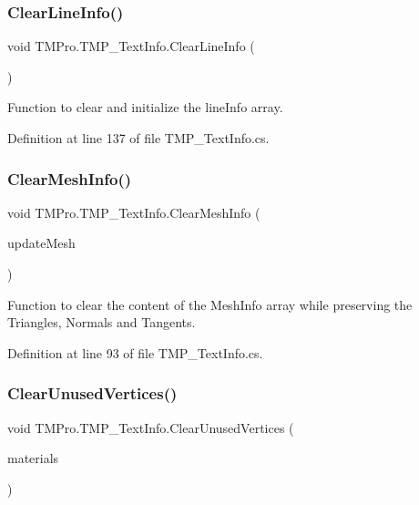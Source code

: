 \subsubsection{\texorpdfstring{ClearLineInfo()}{ClearLineInfo()}}
{\footnotesize\ttfamily void T\+M\+Pro.\+T\+M\+P\+\_\+\+Text\+Info.\+Clear\+Line\+Info (\begin{DoxyParamCaption}{ }\end{DoxyParamCaption})}



Function to clear and initialize the line\+Info array. 



Definition at line 137 of file T\+M\+P\+\_\+\+Text\+Info.\+cs.

\mbox{\label{class_t_m_pro_1_1_t_m_p___text_info_aa34f6fe698de702b8a775b4e57d91ed4}} 
\subsubsection{\texorpdfstring{ClearMeshInfo()}{ClearMeshInfo()}}
{\footnotesize\ttfamily void T\+M\+Pro.\+T\+M\+P\+\_\+\+Text\+Info.\+Clear\+Mesh\+Info (\begin{DoxyParamCaption}\item[{bool}]{update\+Mesh }\end{DoxyParamCaption})}



Function to clear the content of the Mesh\+Info array while preserving the Triangles, Normals and Tangents. 



Definition at line 93 of file T\+M\+P\+\_\+\+Text\+Info.\+cs.

\mbox{\label{class_t_m_pro_1_1_t_m_p___text_info_a7f60ff4e9617668074499ef69eeb9c65}} 
\subsubsection{\texorpdfstring{ClearUnusedVertices()}{ClearUnusedVertices()}}
{\footnotesize\ttfamily void T\+M\+Pro.\+T\+M\+P\+\_\+\+Text\+Info.\+Clear\+Unused\+Vertices (\begin{DoxyParamCaption}\item[{\mbox{\hyperlink{struct_t_m_pro_1_1_material_reference}{Material\+Reference}} \mbox{[}$\,$\mbox{]}}]{materials }\end{DoxyParamCaption})}



